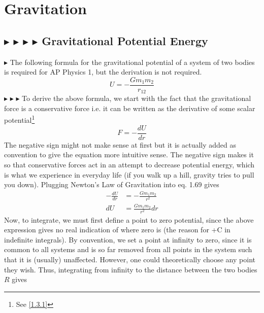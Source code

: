 \clearpage

%
%
%
%

\section{Gravitation}\label{1.5}

%
%
\subsection{\color{OrangeRed} $\blacktriangleright$ \color{PineGreen} $\blacktriangleright$ \color{Goldenrod} $\blacktriangleright$ \color{Orchid} $\blacktriangleright$ \color{black} Gravitational Potential Energy}\label{1.5.1}
\color{OrangeRed} $\blacktriangleright$ \color{black} The following formula for the gravitational potential of a system of two bodies is required for AP Physics 1, but the derivation is not required.
\begin{equation}
    U = -\frac{Gm_1m_2}{r_{12}}
\end{equation}
\noindent \color{PineGreen} $\blacktriangleright$ \color{Goldenrod} $\blacktriangleright$ \color{Orchid} $\blacktriangleright$ \color{black} To derive the above formula, we start with the fact that the gravitational force is a conservative force i.e. it can be written as the derivative of some scalar potential\footnote{See \ref{1.3.1}}
\begin{equation}
    F = -\frac{dU}{dr}
\end{equation}
\noindent The negative sign might not make sense at first but it is actually added as convention to give the equation more intuitive sense. The negative sign makes it so that conservative forces act in an attempt to decrease potential energy, which is what we experience in everyday life (if you walk up a hill, gravity tries to pull you down). Plugging Newton's Law of Gravitation into eq. 1.69 gives
\begin{align*}
    -\frac{dU}{dr} &= -\frac{Gm_1m_2}{r^2} \\
    dU &= \frac{Gm_1m_2}{r^2}dr
\end{align*}
\noindent Now, to integrate, we must first define a point to zero potential, since the above expression gives no real indication of where zero is (the reason for +C in indefinite integrals). By convention, we set a point at infinity to zero, since it is common to all systems and is so far removed from all points in the system such that it is (usually) unaffected. However, one could theoretically choose any point they wish. Thus, integrating from infinity to the distance between the two bodies $R$ gives
